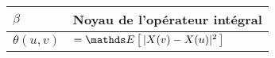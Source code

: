 \begin{figure}[H]
\begin{tabularx}{\textwidth}{lX}
	$\beta$         & Noyau de l'opérateur intégral                                                                                                                                                                   \\
	\midrule
	$\theta(u,v)$   & $= \esperance{ |X(v) - X(u)|^2 }$                                                                                                                                                               \\
	\bottomrule
\end{tabularx}
\end{figure}